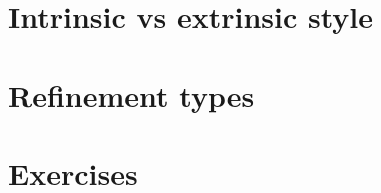 \documentclass{beamer}
\begin{document}
\section{Intrinsic vs extrinsic style}

\section{Refinement types}

\section{Exercises}
\end{document}
